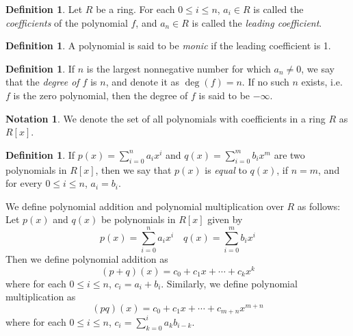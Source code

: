 \documentclass[11pt]{book}
\theoremstyle{definition}\newtheorem{definition}[subsection]{Definition}
\theoremstyle{definition}\newtheorem{example}[subsection]{Example}
\theoremstyle{definition}\newtheorem{notation}[subsection]{Notation}
\theoremstyle{definition}\newtheorem{remark}[subsection]{Remark}
\theoremstyle{theorem}\newtheorem{theorem}[subsection]{Theorem}
\theoremstyle{theorem}\newtheorem{lemma}[subsection]{Lemma}
\theoremstyle{theorem}\newtheorem{proposition}[subsection]{Proposition}
\theoremstyle{theorem}\newtheorem{corollary}[subsection]{Corollary}
\begin{document}
\begin{definition}\label{definition:2.1.2}
    Let $R$ be a ring. For each $0 \leq i \leq n$, $a_i \in R$ is called the \emph{coefficients} of the polynomial $f$, and $a_n \in R$ is called the \emph{leading coefficient}.
\end{definition}

\begin{definition}\label{definition:2.1.3}
    A polynomial is said to be \emph{monic} if the leading coefficient is 1.
\end{definition}

\begin{definition}\label{definition:2.1.4}
    If $n$ is the largest nonnegative number for which $a_n \neq 0$, we say that the \emph{degree of $f$} is $n$, and denote it as $\deg(f) = n$. If no such $n$ exists, i.e. $f$ is the zero polynomial, then the degree of $f$ is said to be $-\infty$.
\end{definition}

\begin{notation}\label{notation:2.1.5}
    We denote the set of all polynomials with coefficients in a ring $R$ as $R[x]$.
\end{notation}

\begin{definition}\label{definition:2.1.6}
    If $p(x) = \sum_{i = 0}^{n} a_ix^i$ and $q(x) = \sum_{i = 0}^{m} b_ix^m$ are two polynomials in $R[x]$, then we say that $p(x)$ is \emph{equal} to $q(x)$, if $n = m$, and for every $0 \leq i \leq n$, $a_i = b_i$.
\end{definition}

We define polynomial addition and polynomial multiplication over $R$ as follows: Let $p(x)$ and $q(x)$ be polynomials in $R[x]$ given by
\begin{equation*}
    p(x) = \sum_{i = 0}^{n} a_ix^i \quad q(x) = \sum_{i = 0}^{m} b_ix^i
\end{equation*}
Then we define polynomial addition as
\begin{equation*}
    (p + q)(x) = c_0 + c_1x + \cdots + c_kx^k
\end{equation*}
where for each $0 \leq i \leq n$, $c_i = a_i + b_i$. Similarly, we define polynomial multiplication as
\begin{equation*}
    (pq)(x) = c_0 + c_1x + \cdots + c_{m + n}x^{m + n}
\end{equation*}
where for each $0 \leq i \leq n$, $c_i = \sum_{k = 0}^{i} a_kb_{i - k}$.  
\end{document}
